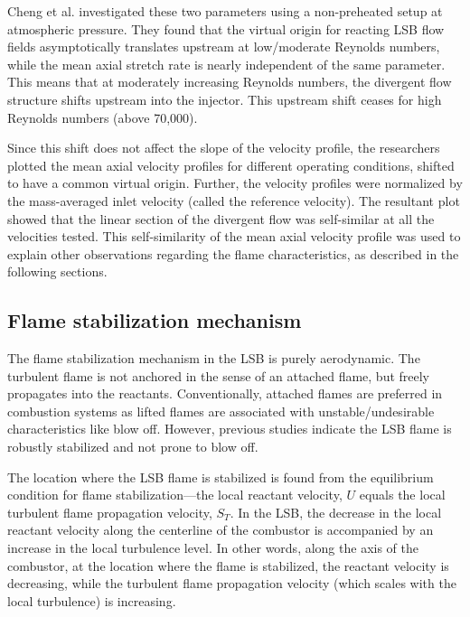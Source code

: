 Cheng et al.\cite{2006-cheng,2008-cheng-a} investigated these two parameters using a non-preheated setup at atmospheric pressure.
They found that the virtual origin for reacting LSB flow fields asymptotically translates upstream at low/moderate Reynolds numbers, while the mean axial stretch rate is nearly independent of the same parameter.
This means that at moderately increasing Reynolds numbers, the divergent flow structure shifts upstream into the injector.
This upstream shift ceases for high Reynolds numbers (above 70,000).

Since this shift does not affect the slope of the velocity profile, the researchers plotted the mean axial velocity profiles for different operating conditions, shifted to have a common virtual origin.
Further, the velocity profiles were normalized by the mass-averaged inlet velocity (called the reference velocity).
The resultant plot showed that the linear section of the divergent flow was self-similar at all the velocities tested.
This self-similarity of the mean axial velocity profile was used to explain other observations regarding the flame characteristics, as described in the following sections.

\subsection{Flame stabilization mechanism}
\label{subsec:lsb-flame-stabilization-mechanism}



The flame stabilization mechanism in the LSB is purely aerodynamic.
The turbulent flame is not anchored in the sense of an attached flame, but freely propagates into the reactants.
Conventionally, attached flames are preferred in combustion systems as lifted flames are associated with unstable/undesirable characteristics like blow off.
However, previous studies\cite{2005-johnson} indicate the LSB flame is robustly stabilized and not prone to blow off.

The location where the LSB flame is stabilized is found from the equilibrium condition for flame stabilization---the local reactant velocity, \(U\) equals the local turbulent flame propagation velocity, \(S_T\).
In the LSB, the decrease in the local reactant velocity along the centerline of the combustor is accompanied by an increase in the local turbulence level.
In other words, along the axis of the combustor, at the location where the flame is stabilized, the reactant velocity is decreasing, while the turbulent flame propagation velocity (which scales with the local turbulence) is increasing.

